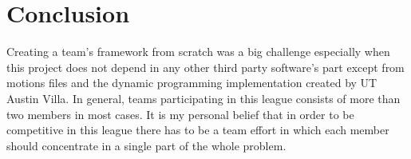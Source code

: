 \chapter{Conclusion}
\label{conclusion}

Creating a team's framework from scratch was a big challenge especially when this project does not depend in any other third party software's part except from motions files and the dynamic programming implementation created by UT Austin Villa. In general, teams participating in this league consists of more than two members in most cases. It is my personal belief that in order to be competitive in this league there has to be a team effort in which each member should concentrate in a single part of the whole problem.
 



